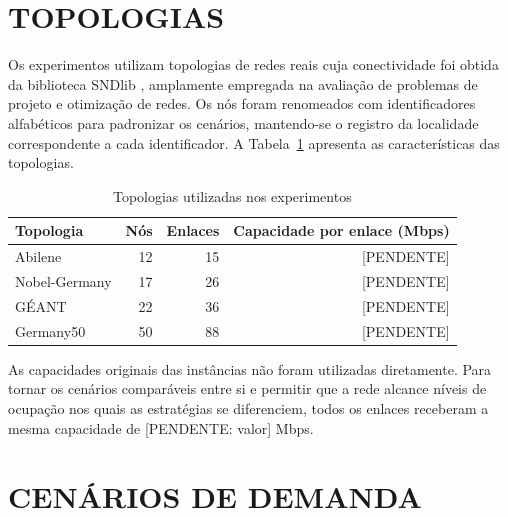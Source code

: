 \section{TOPOLOGIAS}
\label{sec:topologias}

Os experimentos utilizam topologias de redes reais cuja conectividade foi obtida da biblioteca SNDlib \cite{orlowski2010}, amplamente empregada na avaliação de problemas de projeto e otimização de redes. Os nós foram renomeados com identificadores alfabéticos para padronizar os cenários, mantendo-se o registro da localidade correspondente a cada identificador. A Tabela~\ref{tab:topologias} apresenta as características das topologias.

\begin{table}[htb]
    \centering
    \caption{Topologias utilizadas nos experimentos}
    \label{tab:topologias}
    \begin{tabular}{lrrr}
        \hline
        \textbf{Topologia} & \textbf{Nós} & \textbf{Enlaces} & \textbf{Capacidade por enlace (Mbps)} \\
        \hline
        Abilene        & 12 & 15 & [PENDENTE] \\
        Nobel-Germany  & 17 & 26 & [PENDENTE] \\
        GÉANT          & 22 & 36 & [PENDENTE] \\
        Germany50      & 50 & 88 & [PENDENTE] \\
        \hline
    \end{tabular}
\end{table}

As capacidades originais das instâncias não foram utilizadas diretamente. Para tornar os cenários comparáveis entre si e permitir que a rede alcance níveis de ocupação nos quais as estratégias se diferenciem, todos os enlaces receberam a mesma capacidade de [PENDENTE: valor] Mbps.

\section{CENÁRIOS DE DEMANDA}
\label{sec:cenarios}

